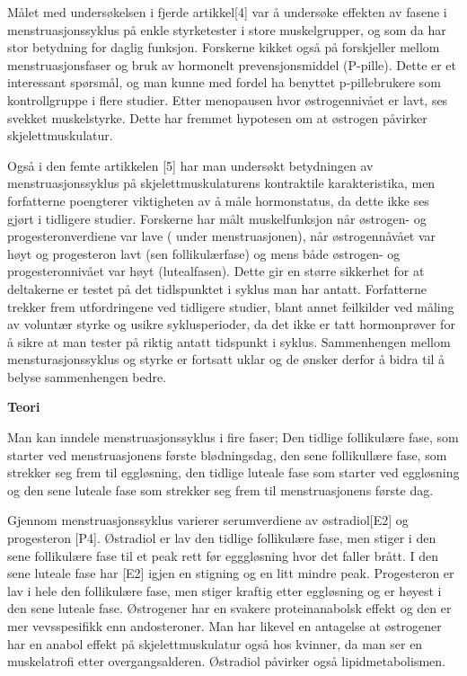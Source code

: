 \documentclass[
  letterpaper,
  DIV=11,
  numbers=noendperiod]{scrreprt}
\begin{document}
Målet med undersøkelsen i fjerde artikkel{[}4{]} var å undersøke
effekten av fasene i menstruasjonssyklus på enkle styrketester i store
muskelgrupper, og som da har stor betydning for daglig funksjon.
Forskerne kikket også på forskjeller mellom menstruasjonsfaser og bruk
av hormonelt prevensjonsmiddel (P-pille). Dette er et interessant
spørsmål, og man kunne med fordel ha benyttet p-pillebrukere som
kontrollgruppe i flere studier. Etter menopausen hvor østrogennivået er
lavt, ses svekket muskelstyrke. Dette har fremmet hypotesen om at
østrogen påvirker skjelettmuskulatur.

Også i den femte artikkelen {[}5{]} har man undersøkt betydningen av
menstruasjonssyklus på skjelettmuskulaturens kontraktile karakteristika,
men forfatterne poengterer viktigheten av å måle hormonstatus, da dette
ikke ses gjørt i tidligere studier. Forskerne har målt muskelfunksjon
når østrogen- og progesteronverdiene var lave ( under menstruasjonen),
når østrogennåvået var høyt og progesteron lavt (sen follikulærfase) og
mens både østrogen- og progesteronnivået var høyt (lutealfasen). Dette
gir en større sikkerhet for at deltakerne er testet på det tidlspunktet
i syklus man har antatt. Forfatterne trekker frem utfordringene ved
tidligere studier, blant annet feilkilder ved måling av voluntær styrke
og usikre syklusperioder, da det ikke er tatt hormonprøver for å sikre
at man tester på riktig antatt tidspunkt i syklus. Sammenhengen mellom
mensturasjonssyklus og styrke er fortsatt uklar og de ønsker derfor å
bidra til å belyse sammenhengen bedre.

\textbf{Teori}

Man kan inndele menstruasjonssyklus i fire faser; Den tidlige
follikulære fase, som starter ved menstruasjonens første blødningsdag,
den sene follikullære fase, som strekker seg frem til eggløsning, den
tidlige luteale fase som starter ved eggløsning og den sene luteale fase
som strekker seg frem til menstruasjonens første dag.

Gjennom menstruasjonssyklus varierer serumverdiene av østradiol{[}E2{]}
og progesteron {[}P4{]}. Østradiol er lav den tidlige follikulære fase,
men stiger i den sene follikulære fase til et peak rett før egggløsning
hvor det faller brått. I den sene luteale fase har {[}E2{]} igjen en
stigning og en litt mindre peak. Progesteron er lav i hele den
follikulære fase, men stiger kraftig etter eggløsning og er høyest i den
sene luteale fase. Østrogener har en svakere proteinanabolsk effekt og
den er mer vevsspesifikk enn andosteroner. Man har likevel en antagelse
at østrogener har en anabol effekt på skjelettmuskulatur også hos
kvinner, da man ser en muskelatrofi etter overgangsalderen. Østradiol
påvirker også lipidmetabolismen.
\end{document}
